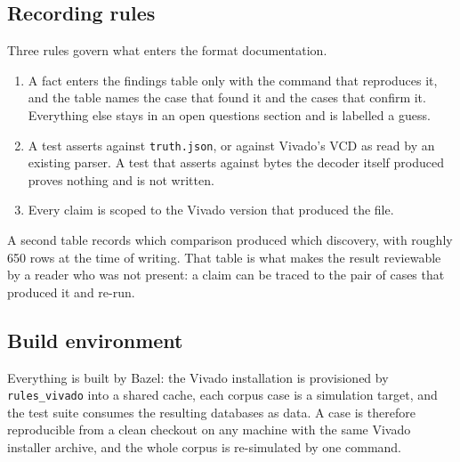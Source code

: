 \subsection{Recording rules}

Three rules govern what enters the format documentation.

\begin{enumerate}
  \item A fact enters the findings table only with the command that
        reproduces it, and the table names the case that found it and
        the cases that confirm it. Everything else stays in an open
        questions section and is labelled a guess.
  \item A test asserts against \texttt{truth.json}, or against
        Vivado's VCD as read by an existing parser. A test that
        asserts against bytes the decoder itself produced proves
        nothing and is not written.
  \item Every claim is scoped to the Vivado version that produced the
        file.
\end{enumerate}

A second table records which comparison produced which discovery, with
roughly 650 rows at the time of writing. That table is what makes the
result reviewable by a reader who was not present: a claim can be
traced to the pair of cases that produced it and re-run.

\subsection{Build environment}

Everything is built by Bazel: the Vivado installation is provisioned
by \texttt{rules\_vivado} into a shared cache, each corpus case is a
simulation target, and the test suite consumes the resulting databases
as data. A case is therefore reproducible from a clean checkout on any
machine with the same Vivado installer archive, and the whole corpus
is re-simulated by one command.
